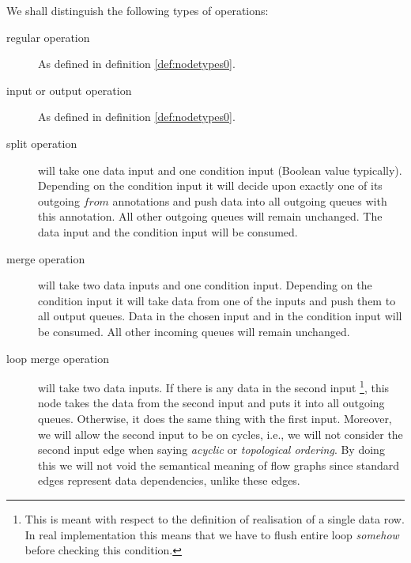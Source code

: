   We shall distinguish the following types of operations:
\begin{description}
\item [regular operation] As defined in definition \ref{def:nodetypes0}.
\item [input or output operation] As defined in definition \ref{def:nodetypes0}.
  \item [split operation] will take one data input and one condition input (Boolean value typically). Depending on the condition input it will decide upon exactly one of its outgoing $from$ annotations and push data into all outgoing queues with this annotation. All other outgoing queues will remain unchanged. The data input and the condition input will be consumed.
  \item [merge operation] will take two data inputs and one condition input. Depending on the condition input it will take data from one of the inputs and push them to all output queues. Data in the chosen input and in the condition input will be consumed. All other incoming queues will remain unchanged.

  \item [loop merge operation] will take two data inputs. If there is any data in the second input \footnote{This is meant with respect to the definition of realisation of a single data row. In real implementation this means that we have to flush entire loop \emph{somehow} before checking this condition.}, this node takes the data from the second input and puts it into all outgoing queues. Otherwise, it does the same thing with the first input. Moreover, we will allow the second input to be on cycles, i.e., we will not consider the second input edge when saying \emph{acyclic} or \emph{topological ordering}. By doing this we will not void the semantical meaning of flow graphs since standard edges represent data dependencies, unlike these edges. 



\end{description}
